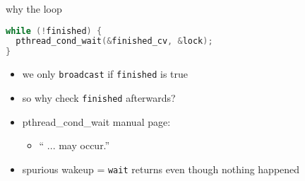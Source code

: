 \begin{frame}[fragile,label=whyLoop]{why the loop}
\begin{lstlisting}[language=C++,style=small]
while (!finished) {
  pthread_cond_wait(&finished_cv, &lock);
}
\end{lstlisting}
\begin{itemize}
  \item we only \texttt{broadcast} if \texttt{finished} is true
  \item so why check \texttt{finished} afterwards?
    \vspace{.5cm}

  \item<2-> pthread\_cond\_wait manual page: 
        \begin{itemize}
          \item `` ... may occur.''
            \end{itemize}
  \item<2-> spurious wakeup = \texttt{wait} returns even though nothing happened
\end{itemize}
\end{frame}

